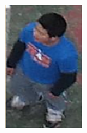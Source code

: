 \begin{figure}[h]
\begin{subfigure}[h]{0.11\textwidth}
        \includegraphics[width=\textwidth]{figures/样本标注示例2.png}
    \end{subfigure}
    ~ %
    \begin{subfigure}[h]{0.11\textwidth}

\end{subfigure}
\end{figure}
